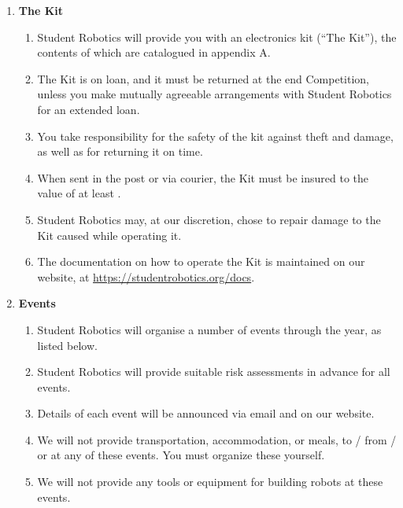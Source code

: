 \documentclass[a4paper, 11pt]{scrartcl}
\begin{document}
\begin{enumerate}
\item \textbf{The Kit}\\
\begin{enumerate}

\item Student Robotics will provide you with an electronics kit (``The Kit''),
the contents of which are catalogued in appendix A.

\item The Kit is on loan, and it must be returned at the end Competition,
unless you make mutually agreeable arrangements with Student Robotics for an
extended loan.

\item You take responsibility for the safety of the kit against theft and
damage, as well as for returning it on time.

\item When sent in the post or via courier, the Kit must be insured to the value
of at least .

\item Student Robotics may, at our discretion, chose to repair damage to the
Kit caused while operating it.

\item The documentation on how to operate the Kit is maintained on our website,
at \url{https://studentrobotics.org/docs}.
\end{enumerate}

\item \textbf{Events}
\begin{enumerate}

\item Student Robotics will organise a number of events through the year, as
listed below.

\item Student Robotics will provide suitable risk assessments in advance for all events.

\item Details of each event will be announced via email and on our website.

\item We will not provide transportation, accommodation, or meals,
to / from / or at any of these events. You must organize these yourself.

\item We will not provide any tools or equipment for building robots at these
events.


\end{enumerate}
\end{enumerate}
\end{document}

